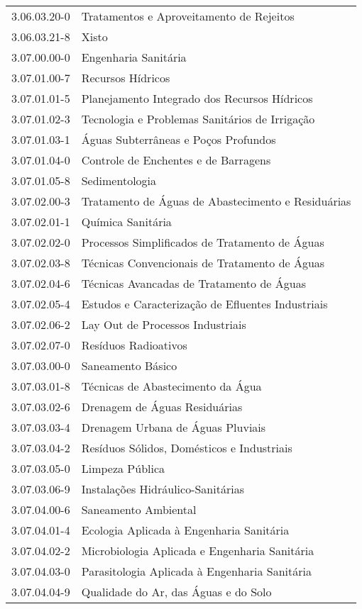 \begin{longtable}[c]{p{2.15cm}p{13cm}}
3.06.03.20-0 & Tratamentos e Aproveitamento de Rejeitos \\
3.06.03.21-8 & Xisto \\
3.07.00.00-0 & Engenharia Sanitária \\
3.07.01.00-7 & Recursos Hídricos \\
3.07.01.01-5 & Planejamento Integrado dos Recursos Hídricos \\
3.07.01.02-3 & Tecnologia e Problemas Sanitários de Irrigação \\
3.07.01.03-1 & Águas Subterrâneas e Poços Profundos \\
3.07.01.04-0 & Controle de Enchentes e de Barragens \\
3.07.01.05-8 & Sedimentologia \\
3.07.02.00-3 & Tratamento de Águas de Abastecimento e Residuárias \\
3.07.02.01-1 & Química Sanitária \\
3.07.02.02-0 & Processos Simplificados de Tratamento de Águas \\
3.07.02.03-8 & Técnicas Convencionais de Tratamento de Águas \\
3.07.02.04-6 & Técnicas Avancadas de Tratamento de Águas \\
3.07.02.05-4 & Estudos e Caracterização de Efluentes Industriais \\
3.07.02.06-2 & Lay Out de Processos Industriais \\
3.07.02.07-0 & Resíduos Radioativos \\
3.07.03.00-0 & Saneamento Básico \\
3.07.03.01-8 & Técnicas de Abastecimento da Água \\
3.07.03.02-6 & Drenagem de Águas Residuárias \\
3.07.03.03-4 & Drenagem Urbana de Águas Pluviais \\
3.07.03.04-2 & Resíduos Sólidos, Domésticos e Industriais \\
3.07.03.05-0 & Limpeza Pública \\
3.07.03.06-9 & Instalações Hidráulico-Sanitárias \\
3.07.04.00-6 & Saneamento Ambiental \\
3.07.04.01-4 & Ecologia Aplicada à Engenharia Sanitária \\
3.07.04.02-2 & Microbiologia Aplicada e Engenharia Sanitária \\
3.07.04.03-0 & Parasitologia Aplicada à Engenharia Sanitária \\
3.07.04.04-9 & Qualidade do Ar, das Águas e do Solo \\

\end{longtable}

